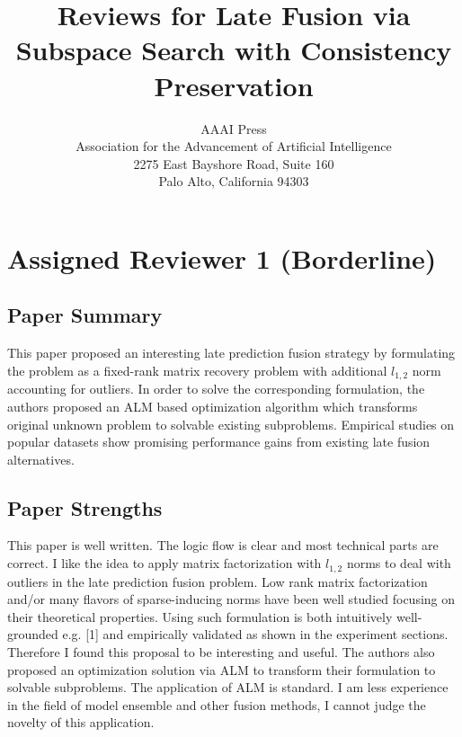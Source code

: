 \documentclass[letterpaper]{article}
\begin{document}
%

\title{Reviews for Late Fusion via Subspace Search with Consistency Preservation}

\author{AAAI Press\\
Association for the Advancement of Artificial Intelligence\\
2275 East Bayshore Road, Suite 160\\
Palo Alto, California 94303\\
}

\maketitle

\section{Assigned Reviewer 1 (Borderline)}
\subsection{Paper Summary}
This paper proposed an interesting late prediction fusion strategy by formulating the problem as a fixed-rank matrix recovery problem with additional $l_{1,2}$ norm accounting for outliers.
In order to solve the corresponding formulation, the authors proposed an ALM based optimization algorithm which transforms original unknown problem to solvable existing subproblems.
Empirical studies on popular datasets show promising performance gains from existing late fusion alternatives.

\subsection{Paper Strengths}
This paper is well written. The logic flow is clear and most technical parts are correct.
I like the idea to apply matrix factorization with $l_{1,2}$ norms to deal with outliers in the late prediction fusion problem. 
Low rank matrix factorization and/or many flavors of sparse-inducing norms have been well studied focusing on their theoretical properties. 
Using such formulation is both intuitively well-grounded e.g. [1] and empirically validated as shown in the experiment sections. 
Therefore I found this proposal to be interesting and useful.
The authors also proposed an optimization solution via ALM to transform their formulation to solvable subproblems. The application of ALM is standard. I am less experience in the field of model ensemble and other fusion methods, I cannot judge the novelty of this application.
\end{document}
